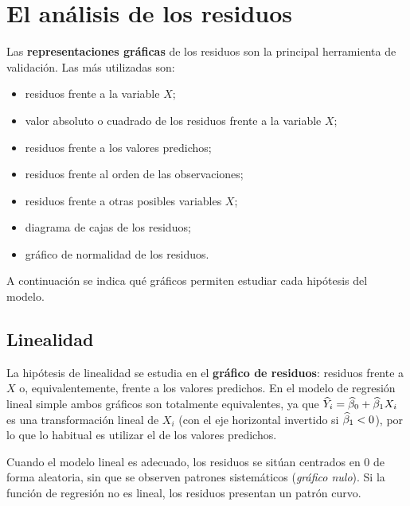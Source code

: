 \section{El análisis de los residuos}
\label{sec:t4-analisis}

Las \textbf{representaciones gráficas} de los residuos son la principal herramienta de
validación. Las más utilizadas son:
\begin{itemize}
  \item residuos frente a la variable $X$;
  \item valor absoluto o cuadrado de los residuos frente a la variable $X$;
  \item residuos frente a los valores predichos;
  \item residuos frente al orden de las observaciones;
  \item residuos frente a otras posibles variables $X$;
  \item diagrama de cajas de los residuos;
  \item gráfico de normalidad de los residuos.
\end{itemize}
A continuación se indica qué gráficos permiten estudiar cada hipótesis del modelo.

\subsection{Linealidad}

La hipótesis de linealidad se estudia en el \textbf{gráfico de residuos}: residuos frente a $X$
o, equivalentemente, frente a los valores predichos. En el modelo de regresión lineal simple
ambos gráficos son totalmente equivalentes, ya que $\widehat{Y}_i=\widehat{\beta}_0+\widehat{\beta}_1X_i$ es una
transformación lineal de $X_i$ (con el eje horizontal invertido si $\widehat{\beta}_1<0$), por lo
que lo habitual es utilizar el de los valores predichos.

Cuando el modelo lineal es adecuado, los residuos se sitúan centrados en 0 de forma aleatoria,
sin que se observen patrones sistemáticos (\emph{gráfico nulo}). Si la función de regresión no es
lineal, los residuos presentan un patrón curvo.

